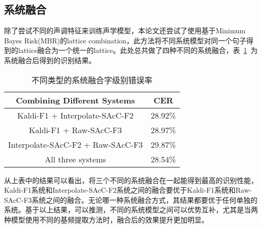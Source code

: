 \subsection{系统融合}
除了尝试不同的声调特征来训练声学模型，本论文还尝试了使用基于Minimum Bayes Risk(MBR)的lattice combination\cite{xu2011minimum}，此方法将不同系统模型对同一个句子得到的lattice融合为一个统一的lattice。此处总共做了四种不同的系统融合，表~\ref{tab:table5}~为系统融合后得到的识别结果。
\begin{table}[htbp]
\caption{不同类型的系统融合字级别错误率}\label{tab:table5}
\vspace{0.5em}\centering\wuhao
\begin{tabular}{cc}
\toprule[1.5pt]
Combining Different Systems & CER \\
\midrule[1pt]
Kaldi-F1 + Interpolate-SAcC-F2 & 28.92\% \\
Kaldi-F1 + Raw-SAcC-F3 & 28.97\% \\
Interpolate-SAcC-F2 + Raw-SAcC-F3 & 29.87\% \\
All three systems & 28.54\% \\
\bottomrule[1.5pt]
\end{tabular}
\vspace{\baselineskip}
\end{table}

从上表中的结果可以看出，将三个不同的系统融合在一起能得到最高的识别性能，Kaldi-F1系统和Interpolate-SAcC-F2系统之间的融合要优于Kaldi-F1系统和Raw-SAcC-F3系统之间的融合。无论哪一种系统融合方式，其结果都要优于任何单独的系统。基于以上结果，可以推测，不同的系统模型之间可以优势互补，尤其是当两种模型使用不同的基频提取方法时，融合后的效果提升更加明显。
